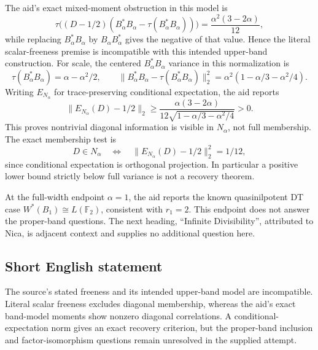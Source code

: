\documentclass[11pt]{article}
\begin{document}
The aid's exact mixed-moment obstruction in this model is
\[
 \tau\bigl((D-1/2)(B_\alpha^*B_\alpha-
                       \tau(B_\alpha^*B_\alpha))\bigr)
       =\frac{\alpha^2(3-2\alpha)}{12},
\]
while replacing \(B_\alpha^*B_\alpha\) by \(B_\alpha B_\alpha^*\) gives the negative of that value. Hence the literal scalar-freeness premise is incompatible with this intended upper-band construction. For scale, the centered \(B_\alpha^*B_\alpha\) variance in this normalization is
\[
 \tau(B_\alpha^*B_\alpha)=\alpha-\alpha^2/2,\qquad
 \|B_\alpha^*B_\alpha-\tau(B_\alpha^*B_\alpha)\|_2^2
       =\alpha^2(1-\alpha/3-\alpha^2/4).
\]
Writing \(E_{N_\alpha}\) for trace-preserving conditional expectation, the aid reports
\[
 \|E_{N_\alpha}(D)-1/2\|_2
 \ge\frac{\alpha(3-2\alpha)}
 {12\sqrt{1-\alpha/3-\alpha^2/4}}>0.
\]
This proves nontrivial diagonal information is visible in \(N_\alpha\), not full membership. The exact membership test is
\[
 D\in N_\alpha\quad\Longleftrightarrow\quad
 \|E_{N_\alpha}(D)-1/2\|_2^2=1/12,
\]
since conditional expectation is orthogonal projection. In particular a positive lower bound strictly below full variance is not a recovery theorem.

At the full-width endpoint \(\alpha=1\), the aid reports the known quasinilpotent DT case \(W^*(B_1)\cong L(\mathbb F_2)\), consistent with \(r_1=2\). This endpoint does not answer the proper-band questions. The next heading, ``Infinite Divisibility'', attributed to Nica, is adjacent context and supplies no additional question here.
\subsection{Short English statement}
The source's stated freeness and its intended upper-band model are incompatible. Literal scalar freeness excludes diagonal membership, whereas the aid's exact band-model moments show nonzero diagonal correlations. A conditional-expectation norm gives an exact recovery criterion, but the proper-band inclusion and factor-isomorphism questions remain unresolved in the supplied attempt.
\end{document}
